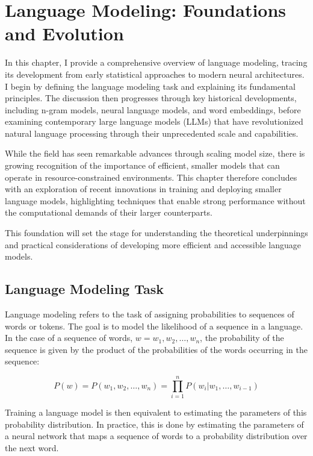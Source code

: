 \chapter{Language Modeling: Foundations and Evolution}

In this chapter, I provide a comprehensive overview of language modeling, tracing its development from early statistical approaches to modern neural architectures. I begin by defining the language modeling task and explaining its fundamental principles. The discussion then progresses through key historical developments, including n-gram models, neural language models, and word embeddings, before examining contemporary large language models (LLMs) that have revolutionized natural language processing through their unprecedented scale and capabilities.

While the field has seen remarkable advances through scaling model size, there is growing recognition of the importance of efficient, smaller models that can operate in resource-constrained environments. This chapter therefore concludes with an exploration of recent innovations in training and deploying smaller language models, highlighting techniques that enable strong performance without the computational demands of their larger counterparts.

This foundation will set the stage for understanding the theoretical underpinnings and practical considerations of developing more efficient and accessible language models. 

\section{Language Modeling Task}
Language modeling refers to the task of assigning probabilities to sequences of words or tokens. The goal is to model the likelihood of a sequence in a language. In the case of a sequence of words, $w = w_1, w_2, \ldots, w_n$, the probability of the sequence is given by the product of the probabilities of the words occurring in the sequence:

\begin{equation}    
    P(w) = P(w_1, w_2, \ldots, w_n) = \prod_{i=1}^n P(w_i | w_1, \ldots, w_{i-1})
\end{equation}

Training a language model is then equivalent to estimating the parameters of this probability distribution. In practice, this is done by estimating the parameters of a neural network that maps a sequence of words to a probability distribution over the next word. 

